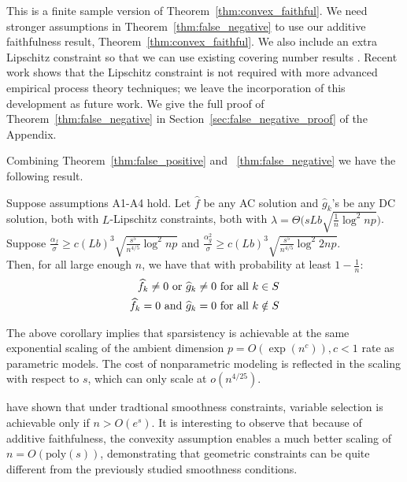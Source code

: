 This is a finite sample version of
Theorem~\ref{thm:convex_faithful}. We need stronger assumptions in
Theorem~\ref{thm:false_negative} to use our additive faithfulness
result, Theorem~\ref{thm:convex_faithful}. We also include an extra
Lipschitz constraint so that we can use existing covering number
results \cite{Bronshtein:76}. Recent work
\cite{Guntu:13} shows that the Lipschitz constraint
is not required with more advanced empirical process theory
techniques; we leave the incorporation of this development as future work. 
We give the full proof of Theorem~\ref{thm:false_negative}
in Section~\ref{sec:false_negative_proof} of the Appendix.

Combining Theorem~\ref{thm:false_positive} and
~\ref{thm:false_negative} 
we have the following result.
\begin{corollary}
Suppose assumptions A1-A4 hold. Let $\hat{f}$ be any AC solution and $\hat{g}_k$'s be any DC solution, both with $L$-Lipschitz constraints, both with 
$\lambda = \Theta \Big( sLb \sqrt{\frac{1}{n} \log^2 np} \Big)$. \\


Suppose 
$\frac{\alpha_f}{\sigma} \geq c (Lb)^3 \sqrt{\frac{s^5}{n^{4/5}} \log^2 np}$ and $\frac{\alpha_g^2}{\sigma} \geq c (Lb)^3 \sqrt{\frac{s^5}{n^{4/5}} \log^2 2np}$.\\

Then, for all large enough $n$, we have that with probability at least $1-\frac{1}{n}$:
\begin{align*}
\widehat{f}_k \neq 0 \textrm{ or } \widehat{g}_k \neq 0 &\textrm{ for all } k \in S\\
\widehat{f}_k = 0 \textrm{ and } \widehat{g}_k = 0 & \textrm{ for all } k \notin S
\end{align*}



\end{corollary}
The above corollary implies that sparsistency is achievable at the same exponential scaling of the ambient dimension $p = O(\exp(n^c)), c<1$ rate as parametric models. The cost of nonparametric modeling is reflected in the scaling with respect to $s$, which can only scale at $o(n^{4/25})$.

\begin{remark}
\citet{dalalyan:12} have shown that under tradtional smoothness constraints, variable selection is achievable only if $n > O(e^s)$. It is interesting to observe that because of additive faithfulness, the convexity assumption enables a much better scaling of $n = O(\textrm{poly}(s))$, demonstrating that geometric constraints can be quite different from the previously studied smoothness conditions.
\end{remark}



 
